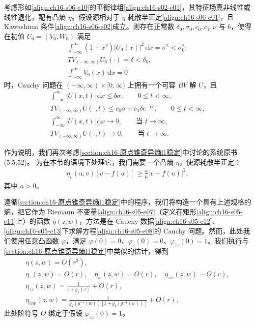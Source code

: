 \documentclass[../../main.tex]{subfiles}
\begin{document}
\begin{theorem}\label{theorem:ch16-1664}
考虑形如\eqref{align:ch16-s06-e10}的平衡律组\eqref{align:ch16-s02-e01}，其特征场真非线性或线性退化，配有凸熵 $\eta$。假设源相对于 $\eta$ 耗散半正定\eqref{align:ch16-s06-e01}，且 Kawashima 条件\eqref{align:ch16-s06-e02}成立。则存在正常数 $\delta_0,\sigma_0,c_0,c_1,\nu$ 与 $b$，使得在初值 $U_0=(V_0,W_0)$ 满足
\begin{align}
\int_{-\infty}^{\infty}(1+x^2)|U_0(x)|^2\,\mathrm{d}x=\sigma^2<\sigma_0^2,
\label{align:ch16-s06-e46}\\
TV_{(-\infty,\infty)}U_0(\cdot)=\delta<\delta_0,
\label{align:ch16-s06-e47}\\
\int_{-\infty}^{\infty}V_0(x)\,\mathrm{d}x=0
\label{align:ch16-s06-e48}
\end{align}
时，Cauchy 问题在 $(-\infty,\infty)\times[0,\infty)$ 上拥有一个可容 $BV$ 解 $U$，且
\begin{align}
\int_{-\infty}^{\infty}|U(x,t)|\,\mathrm{d}x\leqslant b\sigma,\qquad 0\leqslant t<\infty,
\label{align:ch16-s06-e49}\\
TV_{(-\infty,\infty)}U(\cdot,t)\leqslant c_0\sigma+c_1\delta e^{-\nu t},\qquad 0\leqslant t<\infty,
\label{align:ch16-s06-e50}\\
\int_{-\infty}^{\infty}|U(x,t)|\,\mathrm{d}x\to0,\qquad\text{当 }t\to\infty,
\label{align:ch16-s06-e51}\\
TV_{(-\infty,\infty)}U(\cdot,t)\to0,\qquad\text{当 }t\to\infty.
\label{align:ch16-s06-e52}
\end{align}
\end{theorem}

作为说明，我们再次考虑\cref{section:ch16-原点锥奇异熵l1稳定}中讨论的系统原书(5.5.52)。
为在本节的语境下处理它，我们需要一个凸熵 $\eta$，使源耗散半正定：
\begin{align}
\eta_v(u,v)[v-f(u)]\geqslant\frac{a}{\mu}|v-f(u)|^2,
\label{align:ch16-s06-e53}
\end{align}
其中 $a>0$。

遵循\cref{section:ch16-原点锥奇异熵l1稳定}中的程序，我们将构造一个具有上述规格的熵，把它作为 Riemann 不变量\eqref{align:ch16-s05-e07}（定义在矩形\eqref{align:ch16-s05-e11}上）的函数 $\eta(z,w)$，方法是在 Cauchy 数据\eqref{align:ch16-s05-e12}、\eqref{align:ch16-s05-e13}下求解方程\eqref{align:ch16-s05-e08}的 Cauchy 问题。然而，此处我们使用任意凸函数 $\varphi$，满足 $\varphi(0)=0$、$\varphi_z(0)=0$、$\varphi_{zz}(0)=1$。我们执行与\cref{section:ch16-原点锥奇异熵l1稳定}中类似的估计，得到
\begin{align}
\eta(z,w)=O(r^2),
\label{align:ch16-s06-e54}\\
\eta_z(z,w)=O(r),\quad\eta_w(z,w)=O(r),\quad\eta_{zw}(z,w)=O(r),
\label{align:ch16-s06-e55}\\
\eta_{zz}(z,w)=\frac{1}{1+g_z(z)}+O(r),
\label{align:ch16-s06-e56}\\
\eta_{ww}(z,w)=\frac{1}{g_z(g^{-1}(w))[1+g_z(g^{-1}(w))]}+O(r),
\label{align:ch16-s06-e57}
\end{align}
此处阶符号 $O$ 绑定于假设 $\varphi_{zz}(0)=1$。
\end{document}
